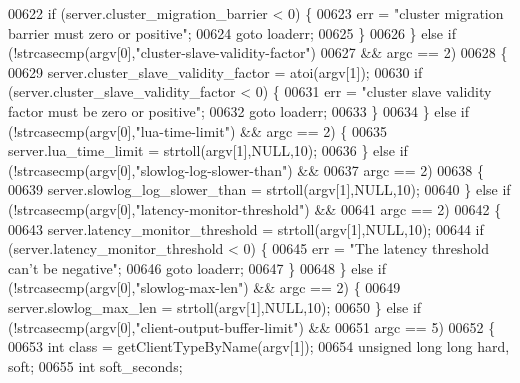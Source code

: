 \begin{DoxyCode}
{{00622             \textcolor{keywordflow}{if} (server.cluster\_migration\_barrier < 0) \{
00623                 err = \textcolor{stringliteral}{"cluster migration barrier must zero or positive"};
00624                 \textcolor{keywordflow}{goto} loaderr;
00625             \}
00626         \} \textcolor{keywordflow}{else} \textcolor{keywordflow}{if} (!strcasecmp(argv[0],\textcolor{stringliteral}{"cluster-slave-validity-factor"})
00627                    && argc == 2)
00628         \{
00629             server.cluster\_slave\_validity\_factor = atoi(argv[1]);
00630             \textcolor{keywordflow}{if} (server.cluster\_slave\_validity\_factor < 0) \{
00631                 err = \textcolor{stringliteral}{"cluster slave validity factor must be zero or positive"};
00632                 \textcolor{keywordflow}{goto} loaderr;
00633             \}
00634         \} \textcolor{keywordflow}{else} \textcolor{keywordflow}{if} (!strcasecmp(argv[0],\textcolor{stringliteral}{"lua-time-limit"}) && argc == 2) \{
00635             server.lua\_time\_limit = strtoll(argv[1],NULL,10);
00636         \} \textcolor{keywordflow}{else} \textcolor{keywordflow}{if} (!strcasecmp(argv[0],\textcolor{stringliteral}{"slowlog-log-slower-than"}) &&
00637                    argc == 2)
00638         \{
00639             server.slowlog\_log\_slower\_than = strtoll(argv[1],NULL,10);
00640         \} \textcolor{keywordflow}{else} \textcolor{keywordflow}{if} (!strcasecmp(argv[0],\textcolor{stringliteral}{"latency-monitor-threshold"}) &&
00641                    argc == 2)
00642         \{
00643             server.latency\_monitor\_threshold = strtoll(argv[1],NULL,10);
00644             \textcolor{keywordflow}{if} (server.latency\_monitor\_threshold < 0) \{
00645                 err = \textcolor{stringliteral}{"The latency threshold can't be negative"};
00646                 \textcolor{keywordflow}{goto} loaderr;
00647             \}
00648         \} \textcolor{keywordflow}{else} \textcolor{keywordflow}{if} (!strcasecmp(argv[0],\textcolor{stringliteral}{"slowlog-max-len"}) && argc == 2) \{
00649             server.slowlog\_max\_len = strtoll(argv[1],NULL,10);
00650         \} \textcolor{keywordflow}{else} \textcolor{keywordflow}{if} (!strcasecmp(argv[0],\textcolor{stringliteral}{"client-output-buffer-limit"}) &&
00651                    argc == 5)
00652         \{
00653             \textcolor{keywordtype}{int} \textcolor{keyword}{class} = getClientTypeByName(argv[1]);
00654             \textcolor{keywordtype}{unsigned} \textcolor{keywordtype}{long} \textcolor{keywordtype}{long} hard, soft;
00655             \textcolor{keywordtype}{int} soft\_seconds;
}}
\end{DoxyCode}
